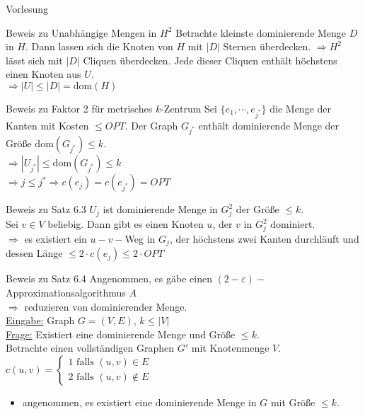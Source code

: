 \begin{section}{Vorlesung}
  \begin{subsection}{Beweis zu Unabhängige Mengen in $H^2$}
    Betrachte kleinste dominierende Menge $D$ in $H$. Dann lassen sich die Knoten von $H$ mit $|D|$ Sternen überdecken. $\Rightarrow H^2$ lässt sich mit $|D|$ Cliquen überdecken. Jede dieser Cliquen enthält höchstens einen Knoten aus $U$.\\
    $\Rightarrow |U| \leq |D| = \text{dom}(H)$
  \end{subsection}
  \begin{subsection}{Beweis zu Faktor 2 für metrisches $k$-Zentrum}
    Sei $\{e_1, \cdots, e_{j^*}\}$ die Menge der Kanten mit Kosten $\leq OPT$. Der Graph $G_{j^*}$ enthält dominierende Menge der Größe $\text{dom}(G_{j^*})\leq k$. \\
    $\Rightarrow |U_{j^*}| \leq \text{dom}(G_{j^*}) \leq k$\\
    $\Rightarrow j \leq j^* \Rightarrow c(e_{j})= c(e_{j^*}) = OPT$
  \end{subsection}
  \begin{subsection}{Beweis zu Satz 6.3}
    $U_j$ ist dominierende Menge in $G_j^2$ der Größe $ \leq k$. \\
    Sei $v \in V$ beliebig. Dann gibt es einen Knoten $u$, der $v$ in $G_j^2$ dominiert.\\
    $\Rightarrow$ es existiert ein $u-v-$Weg in $G_j$, der höchstens zwei Kanten durchläuft und dessen Länge $\leq 2\cdot c(e_j) \leq 2 \cdot OPT$
  \end{subsection}
  \begin{subsection}{Beweis zu Satz 6.4}
    Angenommen, es gäbe einen $(2-\varepsilon)-$Approximationsalgorithmus $A$ \\
    $\Rightarrow$ reduzieren von dominierender Menge. \\
    \underline{Eingabe:} Graph $G = (V,E)$, $ k\leq |V|$\\
    \underline{Frage:} Existiert eine dominierende Menge  und Größe $\leq k$.\\
    Betrachte einen vollständigen Graphen $G'$ mit Knotenmenge $V$.\\
    $c(u,v) = \begin{cases} 1 \text{ falls } (u,v) \in E \\ 2 \text{ falls } (u,v) \not\in E \end{cases}$
    \begin{itemize}
     \item angenommen, es existiert eine dominierende Menge in $G$ mit Größe $\leq k$.

\end{itemize}
\end{subsection}
\end{section}
